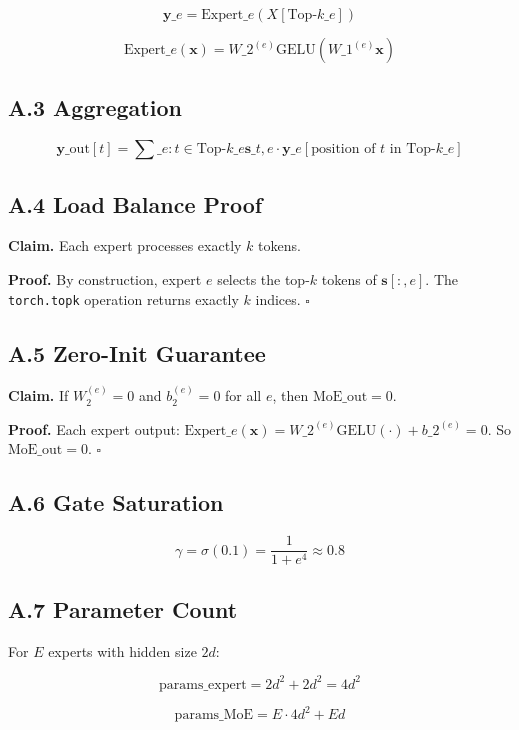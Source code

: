 \[
\mathbf{y}\_e = \text{Expert}\_e(X[\text{Top-}k\_e])
\tag{A.4}
\]

\[
\text{Expert}\_e(\mathbf{x}) = W\_2^{(e)} \text{GELU}(W\_1^{(e)} \mathbf{x})
\tag{A.5}
\]

\subsection{A.3 Aggregation}

\[
\mathbf{y}\_{\text{out}}[t] = \sum\_{e : t \in \text{Top-}k\_e} \mathbf{s}\_{t, e} \cdot \mathbf{y}\_e[\text{position of } t \text{ in } \text{Top-}k\_e]
\tag{A.6}
\]

\subsection{A.4 Load Balance Proof}

\textbf{Claim.} Each expert processes exactly $k$ tokens.

\textbf{Proof.} By construction, expert $e$ selects the top-$k$ tokens of 
$\mathbf{s}[:, e]$. The \texttt{torch.topk} operation returns exactly $k$ 
indices. $\square$

\subsection{A.5 Zero-Init Guarantee}

\textbf{Claim.} If $W_2^{(e)} = 0$ and $b_2^{(e)} = 0$ for all $e$, then 
$\text{MoE\_out} = 0$.

\textbf{Proof.} Each expert output: $\text{Expert}\_e(\mathbf{x}) = W\_2^{(e)} 
\text{GELU}(\cdot) + b\_2^{(e)} = 0$. So $\text{MoE\_out} = 0$. $\square$

\subsection{A.6 Gate Saturation}

\[
\gamma = \sigma(0.1) = \frac{1}{1 + e^{4}} \approx 0.8
\tag{A.7}
\]

\subsection{A.7 Parameter Count}

For $E$ experts with hidden size $2d$:

\[
\text{params}\_\text{expert} = 2 d^2 + 2 d^2 = 4 d^2
\tag{A.8}
\]

\[
\text{params}\_\text{MoE} = E \cdot 4 d^2 + E d
\tag{A.9}
\]

